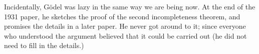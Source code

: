 \documentclass[../../../include/open-logic-section]{subfiles}
\begin{document}
\begin{digress}
Incidentally, G\"odel was lazy in the same way we are
being now. At the end of the 1931 paper, he sketches the proof of the
second incompleteness theorem, and promises the details in a later
paper. He never got around to it; since everyone who understood the
argument believed that it could be carried out (he did not need to
fill in the details.)
\end{digress}
\end{document}
